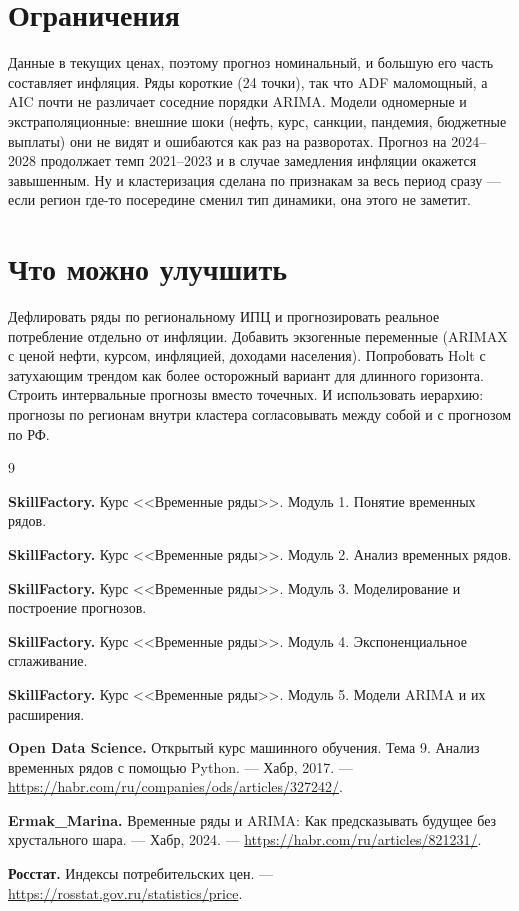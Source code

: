 \documentclass[12pt,a4paper]{report}
\begin{document}
\section{Ограничения}

Данные в текущих ценах, поэтому прогноз номинальный, и большую его часть составляет инфляция. Ряды короткие (24 точки), так что ADF маломощный, а AIC почти не различает соседние порядки ARIMA. Модели одномерные и экстраполяционные: внешние шоки (нефть, курс, санкции, пандемия, бюджетные выплаты) они не видят и ошибаются как раз на разворотах. Прогноз на 2024--2028 продолжает темп 2021--2023 и в случае замедления инфляции окажется завышенным. Ну и кластеризация сделана по признакам за весь период сразу --- если регион где-то посередине сменил тип динамики, она этого не заметит.

\section{Что можно улучшить}

Дефлировать ряды по региональному ИПЦ и прогнозировать реальное потребление отдельно от инфляции. Добавить экзогенные переменные (ARIMAX с ценой нефти, курсом, инфляцией, доходами населения). Попробовать Holt с затухающим трендом как более осторожный вариант для длинного горизонта. Строить интервальные прогнозы вместо точечных. И использовать иерархию: прогнозы по регионам внутри кластера согласовывать между собой и с прогнозом по РФ.

\begin{thebibliography}{9}

\textbf{SkillFactory.} Курс <<Временные ряды>>. Модуль 1. Понятие временных рядов.

\textbf{SkillFactory.} Курс <<Временные ряды>>. Модуль 2. Анализ временных рядов.

\textbf{SkillFactory.} Курс <<Временные ряды>>. Модуль 3. Моделирование и построение прогнозов.

\textbf{SkillFactory.} Курс <<Временные ряды>>. Модуль 4. Экспоненциальное сглаживание.

\textbf{SkillFactory.} Курс <<Временные ряды>>. Модуль 5. Модели ARIMA и их расширения.

\textbf{Open Data Science.}
Открытый курс машинного обучения. Тема 9. Анализ временных рядов с помощью Python. --- Хабр, 2017. ---
\url{https://habr.com/ru/companies/ods/articles/327242/}.

\textbf{Ermak\_Marina.}
Временные ряды и ARIMA: Как предсказывать будущее без хрустального шара. --- Хабр, 2024. ---
\url{https://habr.com/ru/articles/821231/}.

\textbf{Росстат.}
Индексы потребительских цен. ---
\url{https://rosstat.gov.ru/statistics/price}.

\end{thebibliography}
\end{document}
